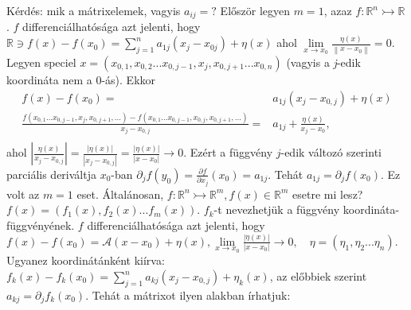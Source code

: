 \documentclass[12pt,a4paper]{scrartcl}
\begin{document}
Kérdés: mik a mátrixelemek, vagyis \(a_{ij} = ?\) Először legyen
\(m = 1\), azaz
\(\left. f:{\mathbb{R}}^{n}\rightarrowtail{\mathbb{R}} \right.\). \(f\)
differenciálhatósága azt jelenti, hogy
\({\mathbb{R}} \ni f\left( x \right) - f\left( x_{0} \right) = {\sum\limits_{j = 1}^{n}{a_{1j}\left( {x_{j} - x_{0j}} \right)}} + \eta\left( x \right)\)
ahol
\(\underset{x\rightarrow x_{0}}{\lim}\frac{\eta\left( x \right)}{\left\| {x - x_{0}} \right\|} = 0\).
Legyen speciel
\(x = \left( {x_{0,1},x_{0,2}...x_{0,j - 1},x_{j},x_{0,j + 1}...x_{0,n}} \right)\)
(vagyis a \emph{j}-edik koordináta nem a 0-ás). Ekkor \[\begin{aligned}
  f\left( x \right) - f\left( {{x_0}} \right) =  & {a_{1j}}\left( {{x_j} - {x_{0,j}}} \right) + \eta \left( x \right) \\ 
  \frac{{f\left( {{x_{0,1}}...{x_{0,j - 1}},{x_j},{x_{0,j + 1}},...} \right) - f\left( {{x_{0,1}}...{x_{0,j - 1}},{x_{0,j}},{x_{0,j + 1}},...} \right)}}{{{x_j} - {x_{0,j}}}} =  & {a_{1j}} + \frac{{\eta \left( x \right)}}{{{x_j} - {x_0}}}, \\ 
\end{aligned} \] ahol
\(\left. \left| \frac{\eta\left( x \right)}{x_{j} - x_{0,j}} \right| = \frac{\left| {\eta\left( x \right)} \right|}{\left| {x_{j} - x_{0,j}} \right|} = \frac{\left| {\eta\left( x \right)} \right|}{\left| {x - x_{0}} \right|}\rightarrow 0 \right.\).
Ezért a függvény \(j\)-edik változó szerinti parciális deriváltja
\(x_{0}\)-ban
\(\partial_{j}f\left( y_{0} \right) = \frac{\partial f}{\partial x_{j}}\left( x_{0} \right) = a_{1j}\).
Tehát \(a_{1j} = \partial_{j}f\left( x_{0} \right)\). Ez volt az
\(m = 1\) eset. Általánosan,
\(\left. f:{\mathbb{R}}^{n}\rightarrowtail{\mathbb{R}}^{m},f\left( x \right) \in {\mathbb{R}}^{m} \right.\)
esetre mi lesz?
\(f\left( x \right) = \left( {f_{1}\left( x \right),f_{2}\left( x \right)...f_{m}\left( x \right)} \right)\).
\(f_{k}\)-t nevezhetjük a függvény koordináta-függvényének. \(f\)
differenciálhatósága azt jelenti, hogy
\(\left. f\left( x \right) - f\left( x_{0} \right) = \mathcal{A}\left( {x - x_{0}} \right) + \eta\left( x \right),\underset{x\rightarrow x_{0}}{\lim}\frac{\left| {\eta\left( x \right)} \right|}{\left| {x - x_{0}} \right|}\rightarrow 0,\quad\eta = \left( {\eta_{1},\eta_{2}...\eta_{n}} \right) \right.\).
Ugyanez koordinátánként kiírva:
\(f_{k}\left( x \right) - f_{k}\left( x_{0} \right) = {\sum\limits_{j = 1}^{n}{a_{kj}\left( {x_{j} - x_{0,j}} \right) + \eta_{k}\left( x \right)}}\),
az előbbiek szerint \(a_{kj} = \partial_{j}f_{k}\left( x_{0} \right)\).
Tehát a mátrixot ilyen alakban írhatjuk:
\end{document}
